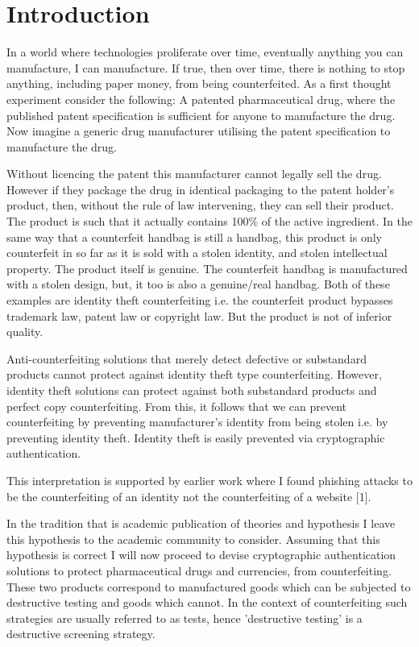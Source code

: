 \documentclass[smallextended]{svjour3}       	\smartqed  \usepackage{graphicx}
\begin{document}
\section{Introduction}
\label{intro}
In a world where technologies proliferate over time, eventually anything you can manufacture, I can manufacture. If true, then over time, there is nothing to stop anything, including paper money, from being counterfeited. As a first thought experiment consider the following: A patented pharmaceutical drug, where the published patent specification is sufficient for anyone to manufacture the drug. Now imagine a generic drug manufacturer utilising the patent specification to manufacture the drug.

Without licencing the patent this manufacturer cannot legally sell the drug. However if they package the drug in identical packaging to the patent holder's product, then, without the rule of law intervening, they can sell their product. The product is such that it actually contains 100\% of the active ingredient. In the same way that a counterfeit handbag is still a handbag, this product is only counterfeit in so far as it is sold with a stolen identity, and stolen intellectual property. The product itself is genuine. The counterfeit handbag is manufactured with a stolen design, but, it too is also a genuine/real handbag. Both of these examples are identity theft counterfeiting i.e. the counterfeit product bypasses trademark law, patent law or copyright law. But the product is not of inferior quality.

Anti-counterfeiting solutions that merely detect defective or substandard products cannot protect against identity theft type counterfeiting. However, identity theft solutions can protect against both substandard products and perfect copy counterfeiting. From this, it follows that we can prevent counterfeiting by preventing manufacturer's identity from being stolen i.e. by preventing identity theft. Identity theft is easily prevented via cryptographic authentication.

This interpretation is supported by earlier work where I found phishing attacks to be the counterfeiting of an identity not the counterfeiting of a website [1].

In the tradition that is academic publication of theories and hypothesis I leave this hypothesis to the academic community to consider. Assuming that this hypothesis is correct I will now proceed to devise cryptographic authentication solutions to protect pharmaceutical drugs and currencies, from counterfeiting. These two products correspond to manufactured goods which can be subjected to destructive testing and goods which cannot. In the context of counterfeiting such strategies are usually referred to as tests, hence 'destructive testing' is a destructive screening strategy.
\end{document}
